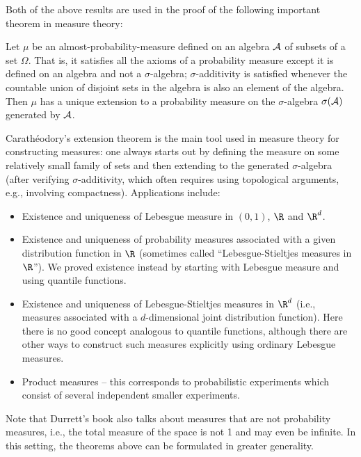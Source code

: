 Both of the above results are used in the proof of
the following important theorem in measure theory:

\begin{thm}
Let $\mu$ be an almost-probability-measure defined on
an algebra ${\cal A}$ of subsets of a set $\Omega$.
That is, it satisfies all the axioms of a probability
measure except it is defined on an algebra and not a
$\sigma$-algebra; $\sigma$-additivity is satisfied
whenever the countable union of disjoint sets in the
algebra is also an element of the algebra. Then $\mu$
has a unique extension to a probability measure on the
$\sigma$-algebra $\sigma({\cal A})$ generated by
${\cal A}$.
\end{thm}

\noindent Carathéodory's extension theorem is the main tool
used in measure theory for constructing measures: one
always starts out by defining the measure on some
relatively small family of sets and then extending to
the generated $\sigma$-algebra (after verifying
$\sigma$-additivity, which often requires using
topological arguments, e.g., involving compactness).
Applications include:

\begin{itemize}
\item Existence and uniqueness of Lebesgue measure in
$(0,1)$, $\R$ and $\R^d$.

\item Existence and uniqueness of probability measures
associated with a given distribution function in $\R$
(sometimes called ``Lebesgue-Stieltjes measures in
$\R$''). We proved existence instead by starting with
Lebesgue measure and using quantile functions.

\item Existence and uniqueness of Lebesgue-Stieltjes
measures in $\R^d$ (i.e., measures associated with a
$d$-dimensional joint distribution function). Here
there is no good concept analogous to quantile
functions, although there are other ways to construct
such measures explicitly using ordinary Lebesgue
measures.

\item Product measures -- this corresponds to probabilistic
experiments which consist of several independent
smaller experiments.
\end{itemize}

\noindent Note that Durrett's book also talks about measures
that are not probability measures, i.e., the total
measure of the space is not 1 and may even be
infinite. In this setting, the theorems above can be
formulated in greater generality.

